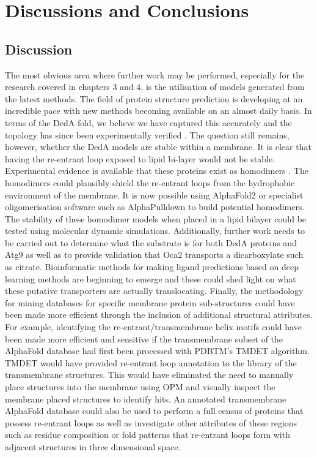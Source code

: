 \chapter{Discussions and Conclusions}
\section{Discussion}

The most obvious area where further work may be performed, especially for the research covered in chapters 3 and 4, is the utilisation of models generated from the latest methods.  The field of protein structure prediction is developing at an incredible pace with new methods becoming available on an almost daily basis.  In terms of the DedA fold, we believe we have captured this accurately and the topology has since been experimentally verified \cite{okawa2021evolution,scarsbrook2021topological}. The question still remains, however, whether the DedA models are stable within a membrane.  It is clear that having the re-entrant loop exposed to lipid bi-layer would not be stable. Experimental evidence is available that these proteins exist as homodimers \cite{scarsbrook2021topological}.  The homodimers could plausibly shield the re-entrant loops from the hydrophobic environment of the membrane. It is now possible using AlphaFold2 or specialist oligomerisation software such as AlphaPulldown \cite{yu2023alphapulldown} to build potential homodimers.  The stability of these homodimer models when placed in a lipid bilayer could be tested using molecular dynamic simulations.  Additionally, further work needs to be carried out to determine what the substrate is for both DedA proteins and Atg9 as well as to provide validation that Oca2 transports a dicarboxylate such as citrate.  Bioinformatic methods for making ligand predictions based on deep learning methods are beginning to emerge \cite{kandel2021puresnet} and these could shed light on what these putative transporters are actually translocating.  Finally, the methodology for mining databases for specific membrane protein sub-structures could have been made more efficient through the inclusion of additional structural attributes. For example, identifying the re-entrant/transmembrane helix motifs could have been made more efficient and sensitive if the transmembrane subset of the AlphaFold database had first been processed with PDBTM's TMDET \cite{Kozma2012} algorithm. TMDET would have provided re-entrant loop annotation to the library of the transmembrane structures. This would have eliminated the need to manually place structures into the membrane using OPM \cite{Lomize2012} and visually inspect the membrane placed structures to identify hits.  An annotated transmembrane AlphaFold database could also be used to perform a full census of proteins that possess re-entrant loops as well as investigate other attributes of these regions such as residue composition or fold patterns that re-entrant loops form with adjacent structures in three dimensional space.

